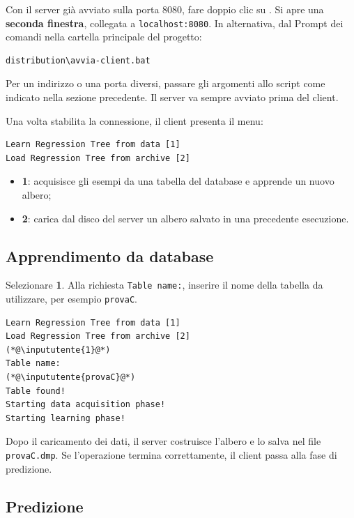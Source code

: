 \documentclass[11pt,a4paper]{article}
\begin{document}
Con il server già avviato sulla porta 8080, fare doppio clic su
. Si apre una \textbf{seconda finestra},
collegata a \texttt{localhost:8080}. In alternativa, dal Prompt dei comandi
nella cartella principale del progetto:

\begin{lstlisting}
distribution\avvia-client.bat
\end{lstlisting}

Per un indirizzo o una porta diversi, passare gli argomenti allo script come
indicato nella sezione precedente. Il server va sempre avviato prima del client.

Una volta stabilita la connessione, il client presenta il menu:

\begin{lstlisting}
Learn Regression Tree from data [1]
Load Regression Tree from archive [2]
\end{lstlisting}

\begin{itemize}
  \item \textbf{1}: acquisisce gli esempi da una tabella del database e apprende
        un nuovo albero;
  \item \textbf{2}: carica dal disco del server un albero salvato in una
        precedente esecuzione.
\end{itemize}

\subsection*{Apprendimento da database}

Selezionare \textbf{1}. Alla richiesta \texttt{Table name:}, inserire il nome
della tabella da utilizzare, per esempio \texttt{provaC}.

\begin{lstlisting}
Learn Regression Tree from data [1]
Load Regression Tree from archive [2]
(*@\inpututente{1}@*)
Table name:
(*@\inpututente{provaC}@*)
Table found!
Starting data acquisition phase!
Starting learning phase!
\end{lstlisting}

Dopo il caricamento dei dati, il server costruisce l'albero e lo salva nel file
\texttt{provaC.dmp}. Se l'operazione termina correttamente, il client passa
alla fase di predizione.

\clearpage
\subsection*{Predizione}
\end{document}
